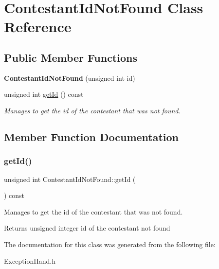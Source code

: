 \hypertarget{class_contestant_id_not_found}{}\section{Contestant\+Id\+Not\+Found Class Reference}
\label{class_contestant_id_not_found}
\subsection*{Public Member Functions}
\begin{DoxyCompactItemize}
\item 
\mbox{\label{class_contestant_id_not_found_a6496870d812f16d0b1fa14a656bb0970}} 
{\bfseries Contestant\+Id\+Not\+Found} (unsigned int id)
\item 
unsigned int \hyperlink{class_contestant_id_not_found_a99fe92bc67ebb5c44bb1f3dc28dc52cb}{get\+Id} () const
\begin{DoxyCompactList}\small\item\em Manages to get the id of the contestant that was not found. \end{DoxyCompactList}\end{DoxyCompactItemize}


\subsection{Member Function Documentation}
\mbox{\label{class_contestant_id_not_found_a99fe92bc67ebb5c44bb1f3dc28dc52cb}} 
\subsubsection{\texorpdfstring{get\+Id()}{getId()}}
{\footnotesize\ttfamily unsigned int Contestant\+Id\+Not\+Found\+::get\+Id (\begin{DoxyParamCaption}{ }\end{DoxyParamCaption}) const\hspace{0.3cm}{\ttfamily [inline]}}



Manages to get the id of the contestant that was not found. 

\begin{DoxyReturn}{Returns}
unsigned integer id of the contestant not found 
\end{DoxyReturn}


The documentation for this class was generated from the following file\+:\begin{DoxyCompactItemize}
\item 
Exception\+Hand.\+h\end{DoxyCompactItemize}
